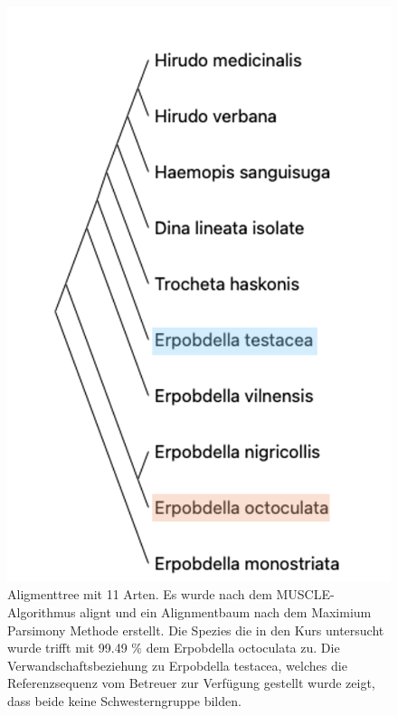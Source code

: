 \documentclass[oneside,10pt,a4paper]{report}
\begin{document}
				\begin{figure}[H]
					\centering
					\includegraphics[scale=0.7]{Anhs Tree.png}
					\caption{Aligmenttree mit 11 Arten. Es wurde nach dem MUSCLE-Algorithmus alignt und ein Alignmentbaum nach dem Maximium Parsimony Methode erstellt. Die Spezies die in den Kurs untersucht wurde trifft mit 99.49 $\%$ dem Erpobdella octoculata zu. Die Verwandschaftsbeziehung zu Erpobdella testacea, welches die Referenzsequenz vom Betreuer zur Verfügung gestellt wurde zeigt, dass beide keine Schwesterngruppe bilden.}
					\label{fig: Baum}
				\end{figure}
				
			
\end{document}

